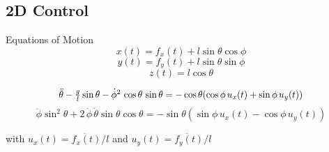 \documentclass{beamer}
\begin{document}
\subsection{2D Control}
\begin{frame}[t]{Equations of Motion}
\begin{equation}
x(t) =f_x(t)+ l \sin{\theta}\cos{\phi}   
\end{equation}
\begin{equation}
  y(t)=f_y(t)+l\sin{\theta}\sin{\phi} 
\end{equation}
\begin{equation}
    z(t)=l \cos{\theta}
\end{equation}



\begin{equation}
\scalebox{0.95}[1]{$\ddot{\theta}-\frac{g}{l}\sin{\theta}- \dot{\phi}^2\, \cos{\theta}\,\sin\theta =-\cos{\theta} (\cos{\phi}\, u_x(t)+ \sin{\phi}\, u_y(t))$} 
\label{teta2d}
\end{equation}
\begin{equation}
  \ddot{\phi}\sin^2{\theta} +2 \, \dot{\phi} \,\dot{\theta}\sin{\theta} \cos{\theta}= -\sin{\theta}(\sin{\phi}\, u_x(t) - \cos{\phi} \,u_y(t))
  \label{phi2d}
\end{equation}

with $u_x(t)=\ddot{f_x(t)}/l$ and $u_y(t)=\ddot{f_y(t)}/l$



\end{frame}
\end{document}
